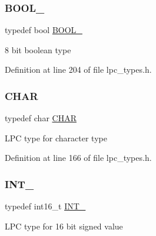 \mbox{\label{group___l_p_c___types___public___types_ga7cc7a8cc54a0a73fbfcc1eb0b792148d}} 
\subsubsection{\texorpdfstring{B\+O\+O\+L\+\_}{BOOL\_8}}
{\footnotesize\ttfamily typedef bool \hyperlink{group___l_p_c___types___public___types_ga7cc7a8cc54a0a73fbfcc1eb0b792148d}{B\+O\+O\+L\+\_}}

8 bit boolean type 

Definition at line 204 of file lpc\+\_\+types.\+h.

\mbox{\label{group___l_p_c___types___public___types_gaebb9e13210d88d43e32e735ada43a425}} 
\subsubsection{\texorpdfstring{C\+H\+AR}{CHAR}}
{\footnotesize\ttfamily typedef char \hyperlink{group___l_p_c___types___public___types_gaebb9e13210d88d43e32e735ada43a425}{C\+H\+AR}}

L\+PC type for character type 

Definition at line 166 of file lpc\+\_\+types.\+h.

\mbox{\label{group___l_p_c___types___public___types_gaae6e34a91bf60db05de64de7720df9a5}} 
\subsubsection{\texorpdfstring{I\+N\+T\+\_}{INT\_16}}
{\footnotesize\ttfamily typedef int16\+\_\+t \hyperlink{group___l_p_c___types___public___types_gaae6e34a91bf60db05de64de7720df9a5}{I\+N\+T\+\_}}

L\+PC type for 16 bit signed value 

